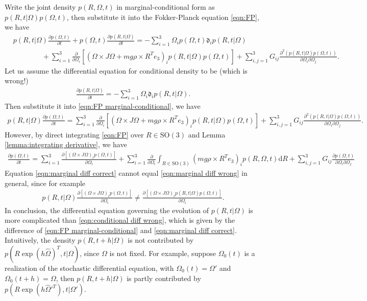 \documentclass[10pt]{article}
\newcommand{\SO}{\ensuremath{\mathrm{SO}(3)}}
\newcommand{\diff}[1]{\mathrm{d}#1}
\newcommand{\liediff}{\mathfrak{d}}
\begin{document}
Write the joint density $p(R,\Omega,t)$ in marginal-conditional form as $p(R,t|\Omega)p(\Omega,t)$, then substitute it into the Fokker-Planck equation \eqref{eqn:FP}, we have
\begin{align} \label{eqn:FP marginal-conditional}
	&p(R,t|\Omega)\frac{\partial p(\Omega,t)}{\partial t} + p(\Omega,t)\frac{\partial p(R,t|\Omega)}{\partial t} = -\sum_{i=1}^3 \Omega_ip(\Omega,t) \liediff_ip(R,t|\Omega) \nonumber \\
	&\qquad\qquad + \sum_{i=1}^3 \frac{\partial}{\partial \Omega_i} \left[ (\Omega\times J\Omega + mg\rho\times R^Te_3)_i p(R,t|\Omega)p(\Omega,t) \right] + \sum_{i,j=1}^3 G_{ij} \frac{\partial^2 (p(R,t|\Omega)p(\Omega,t))}{\partial\Omega_i \partial\Omega_j}.
\end{align}
Let us assume the differential equation for conditional density to be (which is wrong!)
\begin{align} \label{eqn:conditional diff wrong}
	\frac{\partial p(R,t|\Omega)}{\partial t} = -\sum_{i=1}^3 \Omega_i \liediff_ip(R,t|\Omega).
\end{align}
Then substitute it into \eqref{eqn:FP marginal-conditional}, we have
\begin{align} \label{eqn:marginal diff wrong}
	p(R,t|\Omega)\frac{\partial p(\Omega,t)}{\partial t} = \sum_{i=1}^3 \frac{\partial}{\partial \Omega_i} \left[ (\Omega\times J\Omega + mg\rho\times R^Te_3)_i p(R,t|\Omega)p(\Omega,t) \right] + \sum_{i,j=1}^3 G_{ij} \frac{\partial^2 (p(R,t|\Omega)p(\Omega,t))}{\partial\Omega_i \partial\Omega_j}.
\end{align}
However, by direct integrating \eqref{eqn:FP} over $R\in\SO$ and Lemma \ref{lemma:integrating derivative}, we have
\begin{align} \label{eqn:marginal diff correct}
	\frac{\partial p(\Omega,t)}{\partial t} = \sum_{i=1}^3 \frac{\partial \left[ (\Omega\times J\Omega)_i p(\Omega,t) \right]}{\partial \Omega_i} + \sum_{i=1}^3 \frac{\partial}{\partial \Omega_i} \int_{R\in\SO} (mg\rho\times R^Te_3)_ip(R,\Omega,t) \diff{R} + \sum_{i,j=1}^3 G_{ij}\frac{\partial p(\Omega,t)}{\partial\Omega_i \partial\Omega_j}
\end{align}
Equation \eqref{eqn:marginal diff correct} cannot equal \eqref{eqn:marginal diff wrong} in general, since for example
\begin{align*}
	p(R,t|\Omega) \frac{\partial \left[ (\Omega\times J\Omega)_i p(\Omega,t) \right]}{\partial \Omega_i} \neq \frac{\partial \left[ (\Omega\times J\Omega)_i p(R,t|\Omega)p(\Omega,t) \right]}{\partial \Omega_i}.
\end{align*}
In conclusion, the differential equation governing the evolution of $p(R,t|\Omega)$ is more complicated than \eqref{eqn:conditional diff wrong}, which is given by the difference of \eqref{eqn:FP marginal-conditional} and \eqref{eqn:marginal diff correct}.
Intuitively, the density $p(R,t+h|\Omega)$ is not contributed by $p(R\exp(h\hat{\Omega})^T,t|\Omega)$, since $\Omega$ is not fixed.
For example, suppose $\Omega_0(t)$ is a realization of the stochastic differential equation, with $\Omega_0(t) = \Omega'$ and $\Omega_0(t+h) = \Omega$, then $p(R,t+h|\Omega)$ is partly contributed by $p(R\exp(h\hat{\Omega}'^T),t|\Omega')$.
\end{document}
